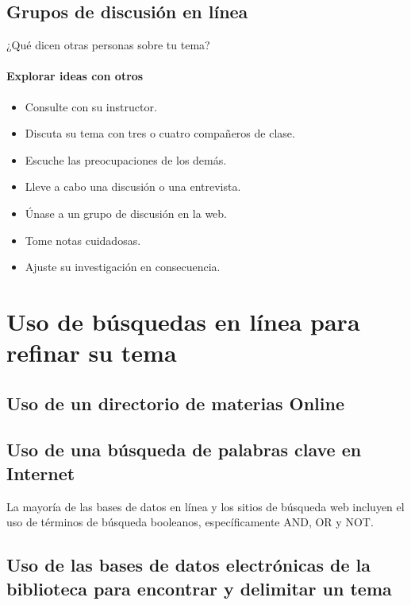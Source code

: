 \subsection{Grupos de discusión en línea}
¿Qué dicen otras personas sobre tu tema?

\paragraph{Explorar ideas con otros}
\begin{itemize}
    \item Consulte con su instructor. 
    \item Discuta su tema con tres o cuatro compañeros de clase. 
    \item Escuche las preocupaciones de los demás. 
    \item Lleve a cabo una discusión o una entrevista. 
    \item Únase a un grupo de discusión en la web. 
    \item Tome notas cuidadosas. 
    \item Ajuste su investigación en consecuencia.
\end{itemize}

\section{Uso de búsquedas en línea para refinar su tema}
\subsection{Uso de un directorio de materias Online}
\subsection{Uso de una búsqueda de palabras clave en Internet}
La mayoría de las bases de datos en línea y los sitios de búsqueda web incluyen el uso de términos de búsqueda booleanos, específicamente AND, OR y NOT.

\subsection{Uso de las bases de datos electrónicas de la biblioteca para encontrar y delimitar un tema}

